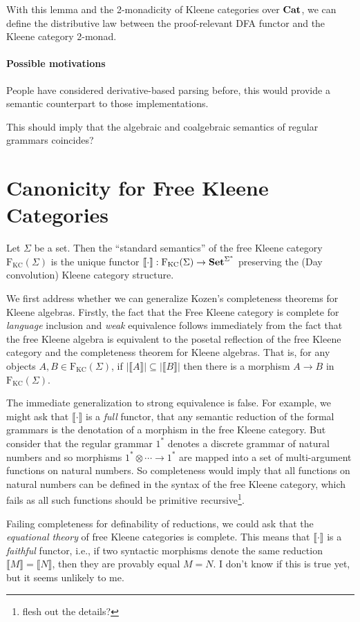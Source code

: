 \documentclass[acmsmall,anonymous,review,screen]{acmart}
\newcommand{\cat}[1]{
  \relax
  \StrLen{#1}[\arglength]
  \ifnum\arglength=1
  \mathcal{#1}
  \else
  \mathbf{#1}
  \fi
}
\newcommand{\FKC}{\textrm{F}_{\textrm{KC}}}
\newcommand{\sem}[1]{\llbracket{#1}\rrbracket}
\newcommand{\Set}{\cat{Set}}
\begin{document}
With this lemma and the 2-monadicity of Kleene categories over $\cat{Cat}$,
we can define the distributive law between the proof-relevant
DFA functor and the Kleene category 2-monad.

\paragraph{Possible motivations}

People have considered derivative-based parsing before, this would provide
a semantic counterpart to those implementations.

This should imply that the algebraic and coalgebraic semantics of regular grammars coincides?

\section{Canonicity for Free Kleene Categories}

Let $\Sigma$ be a set. Then the ``standard semantics'' of the free
Kleene category $\FKC(\Sigma)$ is the unique functor $\sem{\cdot} :
\FKC(\Sigma) \to \Set^{\Sigma^*}$ preserving the (Day convolution)
Kleene category structure.

We first address whether we can generalize Kozen's completeness
theorems for Kleene algebras. Firstly, the fact that the Free Kleene
category is complete for \emph{language} inclusion and \emph{weak}
equivalence follows immediately from the fact that the free Kleene
algebra is equivalent to the posetal reflection of the free Kleene
category and the completeness theorem for Kleene algebras. That is,
for any objects $A, B \in \FKC(\Sigma)$, if $|\sem{A}| \subseteq
|\sem{B}|$ then there is a morphism $A \to B$ in $\FKC(\Sigma)$.

The immediate generalization to strong equivalence is false. For
example, we might ask that $\sem{\cdot}$ is a \emph{full} functor,
that any semantic reduction of the formal grammars is the denotation
of a morphism in the free Kleene category. But consider that the
regular grammar $1^*$ denotes a discrete grammar of natural numbers
and so morphisms $1^* \otimes \cdots \to 1^*$ are mapped into a set of
multi-argument functions on natural numbers. So completeness would
imply that all functions on natural numbers can be defined in the
syntax of the free Kleene category, which fails as all such functions
should be primitive recursive\footnote{flesh out the
details?}.

Failing completeness for definability of reductions, we could ask that
the \emph{equational theory} of free Kleene categories is
complete. This means that $\sem{\cdot}$ is a \emph{faithful} functor,
i.e., if two syntactic morphisms denote the same reduction $\sem{M} =
\sem{N}$, then they are provably equal $M = N$. I don't know if this
is true yet, but it seems unlikely to me.
\end{document}
